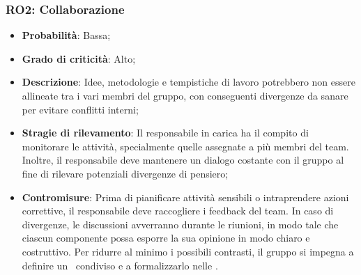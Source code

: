 \subsubsection{RO2: Collaborazione}
\begin{itemize}
    \item \textbf{Probabilità}: Bassa;
    \item \textbf{Grado di criticità}: Alto;
    \item \textbf{Descrizione}: Idee, metodologie e tempistiche di lavoro potrebbero non essere allineate tra i vari membri del gruppo, con conseguenti divergenze da sanare per evitare conflitti interni;
    \item \textbf{Stragie di rilevamento}: Il responsabile in carica ha il compito di monitorare le attività, specialmente quelle assegnate a più membri del team. Inoltre, il responsabile deve mantenere un dialogo costante con il gruppo al fine di rilevare potenziali divergenze di pensiero;
    \item \textbf{Contromisure}: Prima di pianificare attività sensibili o intraprendere azioni correttive, il responsabile deve raccogliere i feedback del team. In caso di divergenze, le discussioni avverranno durante le riunioni, in modo tale che ciascun componente possa esporre la sua opinione in modo chiaro e costruttivo. Per ridurre al minimo i possibili contrasti, il gruppo si impegna a definire un \WoW\ condiviso e a formalizzarlo nelle \NdP.
\end{itemize}
